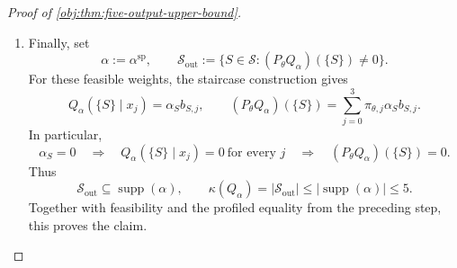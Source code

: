 \begin{proof}[Proof of \cref{obj:thm:five-output-upper-bound}]
\begin{enumerate}
\item
Finally, set
\[
\alpha:=\alpha^{\mathrm{sp}},
\qquad
\mathcal S_{\mathrm{out}}
:=
\{S\in\mathcal S:(P_\theta Q_\alpha)(\{S\})\ne0\}.
\]
For these feasible weights, the staircase construction gives
\[
Q_\alpha(\{S\}\mid x_j)=\alpha_Sb_{S,j},
\qquad
(P_\theta Q_\alpha)(\{S\})
=
\sum_{j=0}^{3}\pi_{\theta,j}\alpha_Sb_{S,j}.
\]
In particular,
\[
\alpha_S=0
\quad\Longrightarrow\quad
Q_\alpha(\{S\}\mid x_j)=0\ \text{for every }j
\quad\Longrightarrow\quad
(P_\theta Q_\alpha)(\{S\})=0.
\]
Thus
\[
\mathcal S_{\mathrm{out}}\subseteq\operatorname{supp}(\alpha),
\qquad
\kappa(Q_\alpha)
=
|\mathcal S_{\mathrm{out}}|
\le|\operatorname{supp}(\alpha)|
\le5.
\]
Together with feasibility and the profiled equality from the preceding
step, this proves the claim.
\end{enumerate}
\end{proof}

